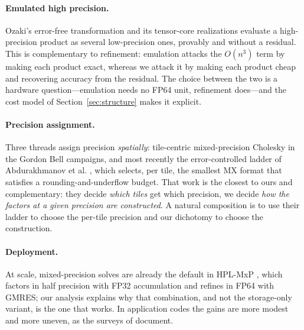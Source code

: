 \documentclass[11pt]{article}
\theoremstyle{remark}
\begin{document}
\paragraph{Emulated high precision.}
Ozaki's error-free transformation \cite{ozaki2012} and its tensor-core
realizations evaluate a high-precision product as several low-precision ones,
provably and without a residual. This is complementary to refinement: emulation
attacks the $O(n^3)$ term by making each product exact, whereas we attack it by
making each product cheap and recovering accuracy from the residual. The choice
between the two is a hardware question---emulation needs no FP64 unit, refinement
does---and the cost model of Section~\ref{sec:structure} makes it explicit.

\paragraph{Precision assignment.}
Three threads assign precision \emph{spatially}: tile-centric mixed-precision
Cholesky in the Gordon Bell campaigns, and most recently the error-controlled
ladder of Abdurakhmanov et al. \cite{mx2026}, which selects, per tile, the
smallest MX format that satisfies a rounding-and-underflow budget. That work is
the closest to ours and complementary: they decide \emph{which tiles} get which
precision, we decide \emph{how the factors at a given precision are
constructed}. A natural composition is to use their ladder to choose the
per-tile precision and our dichotomy to choose the construction.

\paragraph{Deployment.}
At scale, mixed-precision solves are already the default in HPL-MxP
\cite{hplmxp}, which factors in half precision with FP32 accumulation and refines
in FP64 with GMRES; our analysis explains why that combination, and not the
storage-only variant, is the one that works. In application codes the gains are
more modest and more uneven, as the surveys of \cite{kashi2024} document.
\end{document}
